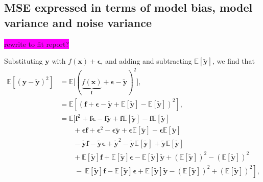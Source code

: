 \documentclass[aps,pra,english,notitlepage,reprint,nofootinbib]{revtex4-1}  %
\begin{document}
\subsection{MSE expressed in terms of model bias, model variance and noise variance}\label{subapp:cost}
\colorbox{magenta}{rewrite to fit report?}

Substituting $\mathbf{y}$ with $f(\mathbf{x}) + \boldsymbol{\epsilon}$, and adding and subtracting $\mathbb{E}\left[\mathbf{\tilde{y}}\right]$, we find that
\begin{align*}
\mathbb{E}\left[(\mathbf{y}-\mathbf{\tilde{y}})^2 \right] 
&= \mathbb{E}\Big[(\underbrace{f(\mathbf{x})}_{\mathbf{f}} + \boldsymbol{\epsilon}-\mathbf{\tilde{y}})^2 \Big],
\\
&= \mathbb{E}\left[(\mathbf{f} + \boldsymbol{\epsilon}-\mathbf{\tilde{y}} + \mathbb{E}\left[\mathbf{\tilde{y}}\right] - \mathbb{E}\left[\mathbf{\tilde{y}}\right])^2\right],
\\
&= \mathbb{E}\Big[\mathbf{f}^2 + \mathbf{f}\boldsymbol{\epsilon} - \mathbf{f}\mathbf{\tilde{y}} + \mathbf{f}\mathbb{E}\left[\mathbf{\tilde{y}}\right] - \mathbf{f}\mathbb{E}\left[\mathbf{\tilde{y}}\right] 
\\
&\hspace{23pt} + \boldsymbol{\epsilon}\mathbf{f} + \boldsymbol{\epsilon}^2 - \boldsymbol{\epsilon}\mathbf{\tilde{y}} + \boldsymbol{\epsilon}\mathbb{E}\left[\mathbf{\tilde{y}}\right] - \boldsymbol{\epsilon}\mathbb{E}\left[\mathbf{\tilde{y}}\right]
\\
&\hspace{23pt} - \mathbf{\tilde{y}}\mathbf{f} - \mathbf{\tilde{y}}\boldsymbol{\epsilon} + \mathbf{\tilde{y}}^2 - \mathbf{\tilde{y}}\mathbb{E}\left[\mathbf{\tilde{y}}\right] + \mathbf{\tilde{y}}\mathbb{E}\left[\mathbf{\tilde{y}}\right]
\\
&\hspace{23pt} + \mathbb{E}\left[\mathbf{\tilde{y}}\right]\mathbf{f} + \mathbb{E}\left[\mathbf{\tilde{y}}\right]\boldsymbol{\epsilon} - \mathbb{E}\left[\mathbf{\tilde{y}}\right]\mathbf{\tilde{y}} + \left(\mathbb{E}\left[\mathbf{\tilde{y}}\right]\right)^2 - \left(\mathbb{E}\left[\mathbf{\tilde{y}}\right]\right)^2
\\
&\hspace{23pt} \left. \:-\: \mathbb{E}\left[\mathbf{\tilde{y}}\right]\mathbf{f} - \mathbb{E}\left[\mathbf{\tilde{y}}\right]\boldsymbol{\epsilon} + \mathbb{E}\left[\mathbf{\tilde{y}}\right]\mathbf{\tilde{y}} - \left(\mathbb{E}\left[\mathbf{\tilde{y}}\right]\right)^2 + \left(\mathbb{E}\left[\mathbf{\tilde{y}}\right]\right)^2 \right],

\end{align*}
\end{document}
